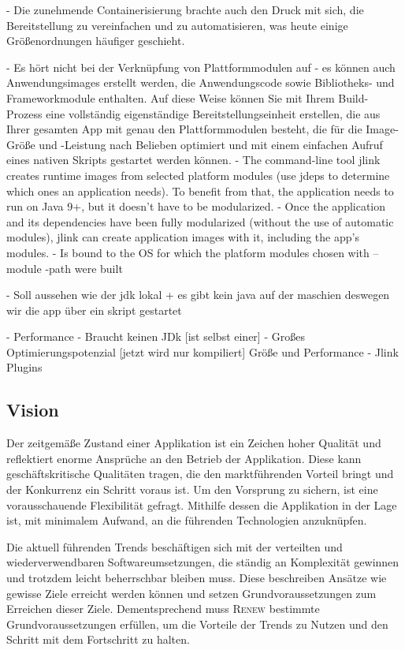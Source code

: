 	- Die zunehmende Containerisierung brachte auch den Druck mit sich, die Bereitstellung zu vereinfachen und zu automatisieren, was heute einige Größenordnungen häufiger geschieht.

	- Es hört nicht bei der Verknüpfung von Plattformmodulen auf - es können auch Anwendungsimages erstellt werden, die Anwendungscode sowie Bibliotheks- und Frameworkmodule enthalten. Auf diese Weise können Sie mit Ihrem Build-Prozess eine vollständig eigenständige Bereitstellungseinheit erstellen, die aus Ihrer gesamten App mit genau den Plattformmodulen besteht, die für die Image-Größe und -Leistung nach Belieben optimiert und mit einem einfachen Aufruf eines nativen Skripts gestartet werden können.
	- The command-line tool jlink creates runtime images from selected platform modules (use jdeps to determine which ones an application needs). To benefit from that, the application needs to run on Java 9+, but it doesn’t have to be modularized.
	- Once the application and its dependencies have been fully modularized (without the use of automatic modules), jlink can create application images with it, including the app’s modules.
	- Is bound to the OS for which the platform modules chosen with --module -path were built


	- Soll aussehen wie der jdk lokal 
	+ es gibt kein java auf der maschien deswegen wir  die app über ein skript gestartet 






		- Performance 
		- Braucht keinen JDk [ist selbst einer]
		- Großes Optimierungspotenzial [jetzt  wird nur kompiliert] Größe und Performance 
		-  Jlink Plugins 

	\subsection{Vision} \label{sub:moderner_zustand}
		Der zeitgemäße Zustand einer Applikation ist ein Zeichen hoher Qualität und reflektiert enorme Ansprüche an den Betrieb der Applikation. Diese kann geschäftskritische Qualitäten tragen, die den marktführenden Vorteil bringt und der Konkurrenz ein Schritt voraus ist. Um den Vorsprung zu sichern, ist eine vorausschauende Flexibilität gefragt. Mithilfe dessen die Applikation in der Lage ist, mit minimalem Aufwand, an die führenden Technologien anzuknüpfen. 

		Die aktuell führenden Trends beschäftigen sich mit der verteilten und wiederverwendbaren Softwareumsetzungen, die ständig an Komplexität gewinnen und trotzdem leicht beherrschbar bleiben muss. Diese beschreiben Ansätze wie gewisse Ziele erreicht werden können und setzen Grundvoraussetzungen zum Erreichen dieser Ziele. Dementsprechend muss \textsc{Renew} bestimmte Grundvoraussetzungen erfüllen, um die Vorteile der Trends zu Nutzen und den Schritt mit dem Fortschritt zu halten.  \bigbreak

